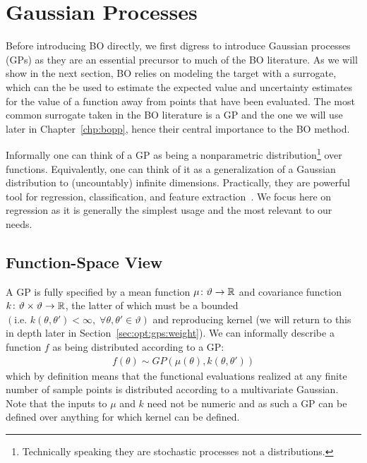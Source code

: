 
\section{Gaussian Processes}
\label{sec:opt:GPs}

Before introducing BO directly, we first digress to introduce Gaussian
processes (GPs) as they are an essential precursor to much of the BO literature.  
As we will show in the next section, BO relies on modeling the target with a surrogate,
which can the be used to estimate the expected value and uncertainty estimates for 
the value of a function away from points that have been evaluated.  The most common
surrogate taken in the BO literature is a GP and the one we will use later in Chapter~\ref{chp:bopp}, 
hence their central importance to the BO method.

Informally one can think of a GP \citep{rasmussen2006gaussian} as being a nonparametric 
distribution\footnote{Technically speaking they are stochastic processes not a distributions.} over functions.
Equivalently, one can think of it as a generalization of a Gaussian distribution
to (uncountably) infinite dimensions.  Practically, they are powerful tool for regression, classification,
and feature extraction~\citep{kuss2005assessing,lawrence2004gaussian}.  We focus here on regression as it is generally
the simplest usage and the most relevant to our needs.

\subsection{Function-Space View}
\label{sec:opt:GPs:function}

A GP is fully specified by a mean function $\mu \colon \vartheta \rightarrow \mathbb{R}$ and covariance function 
$k \colon \vartheta \times \vartheta \rightarrow \mathbb{R}$, the latter of which must be a bounded 
$\left(\text{i.e. }k\left(\theta,\theta'\right)<\infty, \; \forall \theta,\theta' \in \vartheta\right)$ 
and reproducing kernel (we will return to this in depth later in Section~\ref{sec:opt:gps:weight}).  
We can informally describe a function $f$ as being distributed 
according to a GP:
\begin{align}
\label{eq:GP}
f \left(\theta\right) \sim GP \left(\mu\left(\theta\right), k\left(\theta,\theta'\right)\right)
\end{align}
which by definition means that the functional evaluations realized at any finite number of sample points is distributed according to a multivariate Gaussian. Note that the inputs to $\mu$ and $k$ need not be numeric and as such a GP can be defined over anything for which kernel can be defined.

